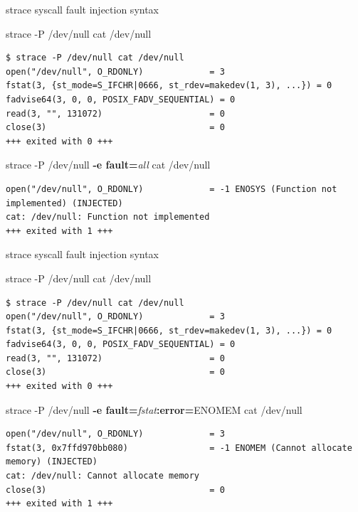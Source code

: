 \documentclass[unicode,aspectratio=169]{beamer}
\begin{document}
\begin{frame}[fragile]{strace syscall fault injection syntax}
\scriptsize
\begin{block}{\large strace -P /dev/null cat /dev/null}
\begin{verbatim}
$ strace -P /dev/null cat /dev/null
open("/dev/null", O_RDONLY)             = 3
fstat(3, {st_mode=S_IFCHR|0666, st_rdev=makedev(1, 3), ...}) = 0
fadvise64(3, 0, 0, POSIX_FADV_SEQUENTIAL) = 0
read(3, "", 131072)                     = 0
close(3)                                = 0
+++ exited with 0 +++
\end{verbatim}
\end{block}
\begin{block}{\large strace -P /dev/null {\bf -e fault=}{\it all} cat /dev/null}
\begin{verbatim}
open("/dev/null", O_RDONLY)             = -1 ENOSYS (Function not implemented) (INJECTED)
cat: /dev/null: Function not implemented
+++ exited with 1 +++
\end{verbatim}
\end{block}
\end{frame}

\begin{frame}[fragile]{strace syscall fault injection syntax}
\scriptsize
\begin{block}{\large strace -P /dev/null cat /dev/null}
\begin{verbatim}
$ strace -P /dev/null cat /dev/null
open("/dev/null", O_RDONLY)             = 3
fstat(3, {st_mode=S_IFCHR|0666, st_rdev=makedev(1, 3), ...}) = 0
fadvise64(3, 0, 0, POSIX_FADV_SEQUENTIAL) = 0
read(3, "", 131072)                     = 0
close(3)                                = 0
+++ exited with 0 +++
\end{verbatim}
\end{block}
\begin{block}{\large strace -P /dev/null {\bf -e fault=}{\it fstat}{\bf :error=}{\sc ENOMEM} cat /dev/null}
\begin{verbatim}
open("/dev/null", O_RDONLY)             = 3
fstat(3, 0x7ffd970bb080)                = -1 ENOMEM (Cannot allocate memory) (INJECTED)
cat: /dev/null: Cannot allocate memory
close(3)                                = 0
+++ exited with 1 +++
\end{verbatim}
\end{block}
\end{frame}
\end{document}
